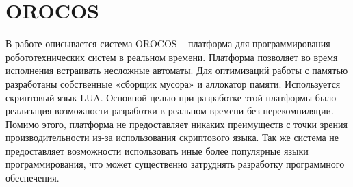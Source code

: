 \section{OROCOS}

В работе \cite{klotzbucher2010orocos}  описывается система 
OROCOS – платформа для программирования робототехнических систем 
в реальном времени. Платформа позволяет во время исполнения 
встраивать несложные автоматы. Для оптимизаций работы с памятью 
разработаны собственные «сборщик мусора» и аллокатор памяти. 
Используется скриптовый язык LUA. Основной целью при разработке 
этой платформы было реализация возможности разработки в реальном 
времени без перекомпиляции. Помимо этого, платформа не 
предоставляет никаких преимуществ с точки зрения 
производительности из-за использования скриптового языка. Так же 
система не предоставляет возможности использовать иные более 
популярные языки программирования, что может существенно 
затруднять разработку программного обеспечения.